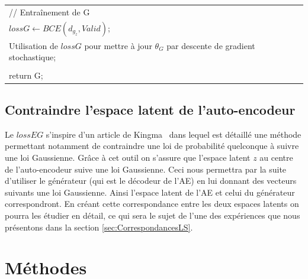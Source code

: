 \documentclass[11pt,francais]{article}
\begin{document}
\begin{table}[t!]
\begin{tabular}{l}
  \hspace{1cm}// Entraînement de G\tabularnewline
  \hspace{1cm}\(lossG\leftarrow BCE(d_{g_z},Valid)\);\tabularnewline
  \hspace{1cm}Utilisation de \(lossG\) pour mettre à jour \(\theta_G\) par descente de gradient stochastique;\tabularnewline
  \tabularnewline
  
  return G;\tabularnewline
  \hline
  \end{tabular}
  \label{tab:tab2}
\end{table}


\subsection{Contraindre l'espace latent de l'auto-encodeur}
\label{sec:LatentSpace}
Le \(lossEG\) s'inspire d'un article de Kingma~\cite{kingma2013auto} dans lequel est détaillé une méthode permettant notamment de contraindre une loi de probabilité quelconque à suivre une loi Gaussienne. Grâce à cet outil on s'assure que l'espace latent \(z\) au centre de l'auto-encodeur suive une loi Gaussienne. Ceci nous permettra par la suite d'utiliser le générateur (qui est le décodeur de l'AE) en lui donnant des vecteurs suivants une loi Gaussienne. Ainsi l'espace latent de l'AE et celui du générateur correspondront.
En créant cette correspondance entre les deux espaces latents on pourra les étudier en détail, ce qui sera le sujet de l'une des expériences que nous présentons dans la section \ref{sec:CorrespondancesLS}.

\section{Méthodes}
\end{document}
